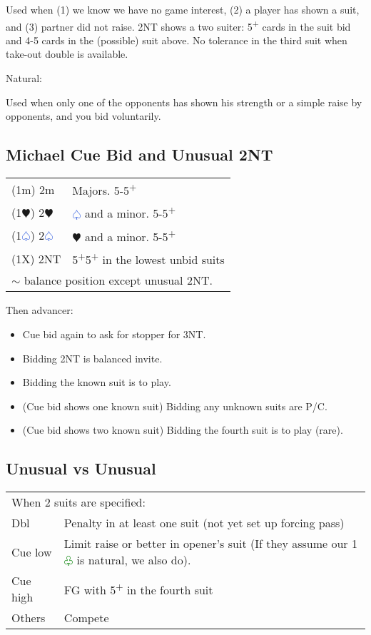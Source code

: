 \documentclass{article}
\renewcommand{\sp}{\textcolor{RoyalBlue}{$\varspade$}}
\newcommand{\he}{\textcolor{RubineRed}{$\varheart$}}
\newcommand{\cl}{\textcolor{Green}{$\varclub$}}
\newcommand{\nt}{\relsize{-1}NT\relsize{1}}
\newcommand{\up}{\textsuperscript{+}}
\begin{document}
	Used when (1) we know we have no game interest, (2) a player has shown a suit, and (3) partner did not raise. 2\nt{} shows a two suiter: 5\up{} cards in the suit bid and 4-5 cards in the (possible) suit above. No tolerance in the third suit when take-out double is available.
	
	\medskip

	Natural:

	Used when only one of the opponents has shown his strength or a simple raise by opponents, and you bid voluntarily.

\subsection{Michael Cue Bid and Unusual 2\nt{}}

\begin{tabular}{|l|p{6.5cm}}
	(1m) 2m & Majors. 5-5\up{} \\
	(1\he{}) 2\he{} & \sp{} and a minor. 5-5\up{} \\
	(1\sp{}) 2\sp{} & \he{} and a minor. 5-5\up{} \\
	(1X) 2\nt{} & 5\up{}5\up{} in the lowest unbid suits \\
	\multicolumn{2}{l}{$\sim$ balance position except unusual 2\nt{}.} \\
\end{tabular}

Then advancer:
\begin{itemize}
\itemsep0em
	\item Cue bid again to ask for stopper for 3\nt{}.
	\item Bidding 2\nt{} is balanced invite.
	\item Bidding the known suit is to play.
	\item (Cue bid shows one known suit) Bidding any unknown suits are P/C.
	\item (Cue bid shows two known suit) Bidding the fourth suit is to play (rare).
\end{itemize}

\subsection{Unusual vs Unusual}

\begin{tabular}{|l|p{6.5cm}}
	\multicolumn{2}{l}{When 2 suits are specified:} \\
    Dbl & Penalty in at least one suit (not yet set up forcing pass) \\
    Cue low & Limit raise or better in opener's suit (If they assume our 1\cl{} is natural, we also do). \\
    Cue high & FG with 5\up{} in the fourth suit \\
    Others & Compete \\
\end{tabular}
\end{document}
